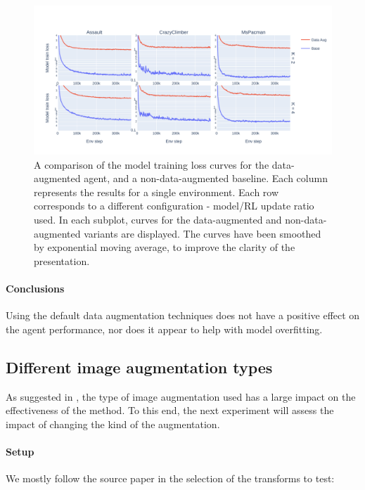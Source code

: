 \documentclass[en]{pracamgr}
\newcommand{\figurewidth}{\linewidth}
\newcommand{\figureheight}{0.8\paperheight}
\begin{document}
\begin{figure}
  \centering
  \includegraphics[width=\figurewidth,height=\figureheight,keepaspectratio]{assets/data_aug.train_curves.pdf}
  \caption{A comparison of the model training loss curves for the data-augmented agent, and a non-data-augmented baseline. Each column represents the results for a single environment. Each row corresponds to a different configuration - model/RL update ratio used. In each subplot, curves for the data-augmented and non-data-augmented variants are displayed. The curves have been smoothed by exponential moving average, to improve the clarity of the presentation.}
  \label{fig:data_aug_train_curves}
\end{figure}

\paragraph{Conclusions} Using the default data augmentation techniques does not have a positive effect on the agent performance, nor does it appear to help with model overfitting.

\subsection{Different image augmentation types}

As suggested in \autocite{kostrikovImageAugmentationAll2021}, the type of image augmentation used has a large impact on the effectiveness of the method. To this end, the next experiment will assess the impact of changing the kind of the augmentation.

\paragraph{Setup} We mostly follow the source paper in the selection of the transforms to test:
\end{document}
